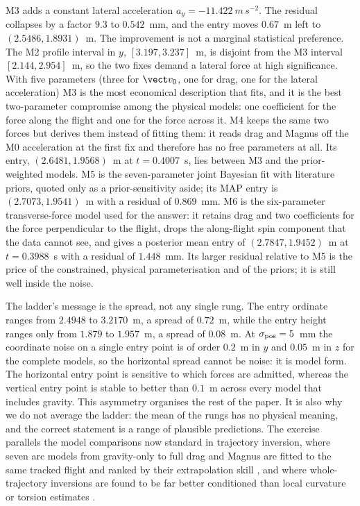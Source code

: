 M3 adds a constant lateral acceleration $a_y=-11.422~\si{m\,s^{-2}}$. The
residual collapses by a factor $9.3$ to $0.542$~mm, and the entry moves
$0.67$~m left to $(2.5486,1.8931)$~m. The improvement is not a marginal
statistical preference. The M2 profile interval in $y$, $[3.197,3.237]$~m, is
disjoint from the M3 interval $[2.144,2.954]$~m, so the two fixes demand a
lateral force at high significance. With five parameters (three for $\vect v_0$,
one for drag, one for the lateral acceleration) M3 is the most economical
description that fits, and it is the best two-parameter compromise among the
physical models: one coefficient for the force along the flight and one for the
force across it. M4 keeps the same two forces but derives them instead of fitting
them: it reads drag and Magnus off the M0 acceleration at the first fix and
therefore has no free parameters at all. Its entry, $(2.6481,1.9568)$~m at
$t=0.4007$~s, lies between M3 and the prior-weighted models. M5 is the
seven-parameter joint Bayesian fit with literature priors, quoted only as a
prior-sensitivity aside; its MAP entry is $(2.7073,1.9541)$~m with a residual of
$0.869$~mm. M6 is the six-parameter transverse-force model used for the answer:
it retains drag and two coefficients for the force perpendicular to the flight,
drops the along-flight spin component that the data cannot see, and gives a
posterior mean entry of $(2.7847,1.9452)$~m at $t=0.3988$~s with a residual of
$1.448$~mm. Its larger residual relative to M5 is the price of the constrained,
physical parameterisation and of the priors; it is still well inside the noise.

The ladder's message is the spread, not any single rung. The entry ordinate ranges
from $2.4948$ to $3.2170$~m, a spread of $0.72$~m, while the entry height ranges
only from $1.879$ to $1.957$~m, a spread of $0.08$~m. At $\sigma_{\rm pos}=5$~mm
the coordinate noise on a single entry point is of order $0.2$~m in $y$ and
$0.05$~m in $z$ for the complete models, so the horizontal spread cannot be noise:
it is model form. The horizontal entry point is sensitive to which forces are
admitted, whereas the vertical entry point is stable to better than $0.1$~m
across every model that includes gravity. This asymmetry organises the rest of
the paper. It is also why we do not average the ladder: the mean of the rungs has
no physical meaning, and the correct statement is a range of plausible
predictions. The exercise parallels the model comparisons now standard in
trajectory inversion, where seven arc models from gravity-only to full drag and
Magnus are fitted to the same tracked flight and ranked by their extrapolation
skill \citep{grad2026}, and where whole-trajectory inversions are found to be far
better conditioned than local curvature or torsion estimates
\citep{jsme2014}.

